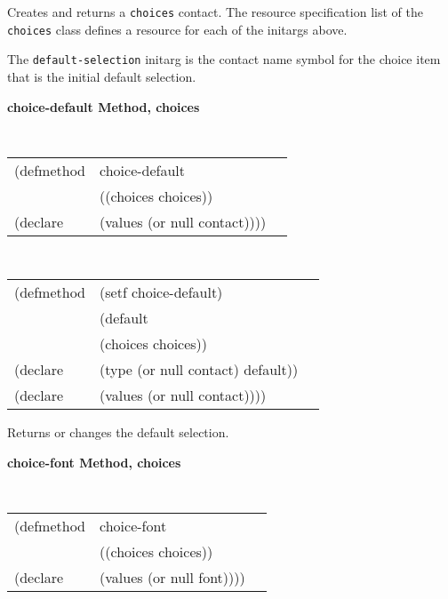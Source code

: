\begin{flushright} \parbox[t]{6.125in}{
Creates and returns a {\tt choices} contact.
The resource specification list of the {\tt choices} class defines
a resource for each of the initargs above.

The {\tt default-selection} initarg is the contact name symbol for the choice item
that is the initial default selection.

}\end{flushright}

{\samepage
{\large {\bf choice-default \hfill Method, choices}}
\begin{flushright} \parbox[t]{6.125in}{
\tt
\begin{tabular}{lll}
\raggedright
(defmethod & choice-default & \\
& ((choices  choices)) \\
(declare & (values (or null contact))))
\end{tabular}
\rm

}\end{flushright}}

{\samepage
\begin{flushright} \parbox[t]{6.125in}{
\tt
\begin{tabular}{lll}
\raggedright
(defmethod & (setf choice-default) & \\
         & (default \\
         & (choices choices)) \\
(declare &(type (or null contact)  default))\\
(declare & (values (or null contact))))
\end{tabular}
\rm
}
\end{flushright}}



\begin{flushright} \parbox[t]{6.125in}{
Returns or changes the default selection.

}\end{flushright}

{\samepage
{\large {\bf choice-font \hfill Method, choices}}
\begin{flushright} \parbox[t]{6.125in}{
\tt
\begin{tabular}{lll}
\raggedright
(defmethod & choice-font & \\
& ((choices  choices)) \\
(declare & (values (or null font))))
\end{tabular}
\rm

}\end{flushright}}

